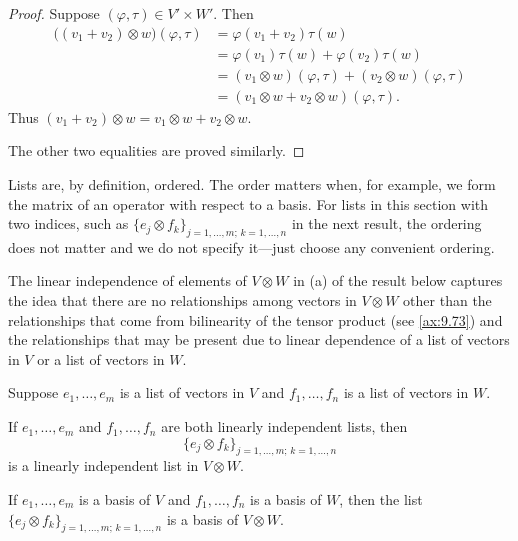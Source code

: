 \begin{proof}
Suppose $(\varphi,\tau)\in V'\times W'$. Then
\begin{align*}
\bigl((v_1+v_2)\otimes w\bigr)(\varphi,\tau) &= \varphi(v_1+v_2)\tau(w)\\
  &= \varphi(v_1)\tau(w)+\varphi(v_2)\tau(w)\\
  &= (v_1\otimes w)(\varphi,\tau)+(v_2\otimes w)(\varphi,\tau)\\
  &= (v_1\otimes w+v_2\otimes w)(\varphi,\tau).
\end{align*}
Thus $(v_1+v_2)\otimes w=v_1\otimes w+v_2\otimes w$.

The other two equalities are proved similarly.
\end{proof}

Lists are, by definition, ordered. The order matters when, for example, we
form the matrix of an operator with respect to a basis. For lists in this
section with two indices, such as
$\{e_j\otimes f_k\}_{j=1,\dots,m;\,k=1,\dots,n}$ in the next result, the
ordering does not matter and we do not specify it---just choose any convenient
ordering.

The linear independence of elements of $V\otimes W$ in (a) of the result below
captures the idea that there are no relationships among vectors in
$V\otimes W$ other than the relationships that come from bilinearity of the
tensor product (see \ref{ax:9.73}) and the relationships that may be present
due to linear dependence of a list of vectors in $V$ or a list of vectors in
$W$.

\begin{result}\label{ax:9.74}
Suppose $e_1,\dots,e_m$ is a list of vectors in $V$ and $f_1,\dots,f_n$ is a
list of vectors in $W$.
\begin{parts}
\item If $e_1,\dots,e_m$ and $f_1,\dots,f_n$ are both linearly independent
  lists, then
  \[ \{e_j\otimes f_k\}_{j=1,\dots,m;\,k=1,\dots,n} \]
  is a linearly independent list in $V\otimes W$.
\item If $e_1,\dots,e_m$ is a basis of $V$ and $f_1,\dots,f_n$ is a basis of
  $W$, then the list $\{e_j\otimes f_k\}_{j=1,\dots,m;\,k=1,\dots,n}$ is a
  basis of $V\otimes W$.
\end{parts}
\end{result}

